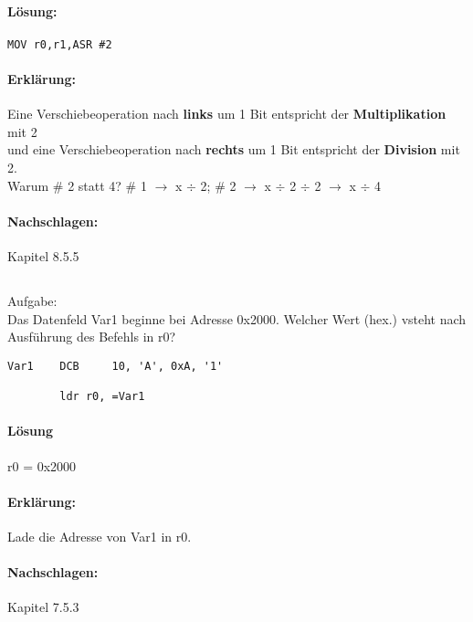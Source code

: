 \paragraph*{Lösung:}

\begin{lstlisting}
MOV r0,r1,ASR #2
\end{lstlisting}


\paragraph*{Erklärung:}
Eine Verschiebeoperation nach \textbf{links} um 1 Bit entspricht der \textbf{Multiplikation} mit 2 \\
und eine Verschiebeoperation nach \textbf{rechts} um 1 Bit entspricht der \textbf{Division} mit 2. \\
Warum \# 2 statt 4? \# 1 $\rightarrow$ x $\div$ 2; \# 2 $\rightarrow$ x $\div$ 2 $\div$ 2 $\rightarrow$ x $\div$ 4 


\paragraph*{Nachschlagen:}
Kapitel 8.5.5

\subsection{}
Aufgabe:\\
Das Datenfeld Var1 beginne bei Adresse 0x2000. Welcher Wert (hex.) vsteht nach Ausführung des Befehls in r0?\\

\begin{lstlisting}
Var1 	DCB 	10, 'A', 0xA, '1'

		ldr r0, =Var1
\end{lstlisting}

\paragraph*{Lösung}
r0 = 0x2000

\paragraph*{Erklärung:}
Lade die Adresse von Var1 in r0. 


\paragraph*{Nachschlagen:}
Kapitel 7.5.3

